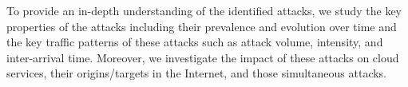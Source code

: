
To provide an in-depth understanding of the identified attacks, we study the
key properties of the attacks including their prevalence and evolution over
time and the key traffic patterns of these attacks such as attack volume,
intensity, and inter-arrival time.  Moreover, we investigate the impact of
these attacks on cloud services, their origins/targets in the Internet, and
those simultaneous attacks.


